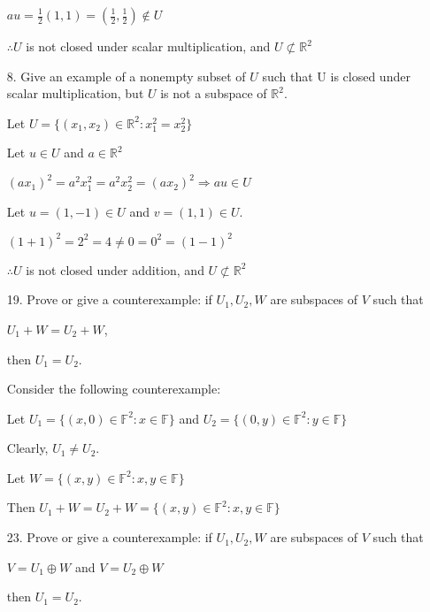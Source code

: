 \documentclass{article}
\begin{document}
\begin{enumerate}[nolistsep]
		$au = \frac{1}{2}(1, 1) = (\frac{1}{2}, \frac{1}{2}) \not\in U$
		
		$\therefore U$ is not closed under scalar multiplication, and $U \not\subset \mathbb{R}^2$
		
		\item[8.] Give an example of a nonempty subset of $U$ such that U is closed under scalar multiplication, but $U$ is not a subspace of $\mathbb{R}^2$.
		
		Let $U = \{(x_1, x_2) \in \mathbb{R}^2 : x_1^2 = x_2^2\}$
		
		Let $u \in U$ and $a \in \mathbb{R}^2$
		
		$(ax_1)^2 = a^2x_1^2 = a^2x_2^2 = (ax_2)^2 \Rightarrow au \in U$
		
		Let $u = (1, -1) \in U$ and $v = (1, 1) \in U$.
		
		$(1 + 1)^2 = 2^2 = 4 \neq 0 = 0^2 = (1 - 1)^2$
		
		$\therefore U$ is not closed under addition, and $U \not\subset \mathbb{R}^2$
		
		\item[19.] Prove or give a counterexample: if $U_1, U_2, W$ are subspaces of $V$ such that
		
\centerline{$U_1 + W = U_2 + W$,}

then $U_1 = U_2$. 
		
		Consider the following counterexample:

		Let $U_1 = \{(x, 0) \in \mathbb{F}^2 : x \in \mathbb{F}\}$ and $U_2 = \{(0, y) \in \mathbb{F}^2 : y \in \mathbb{F}\}$
		
		Clearly, $U_1 \neq U_2$.
		
		Let $W = \{(x, y) \in \mathbb{F}^2 : x, y \in \mathbb{F}\}$
		
		Then $U_1 + W = U_2 + W = \{(x, y) \in \mathbb{F}^2 : x, y \in \mathbb{F}\}$
		
		\item[23.] Prove or give a counterexample: if $U_1, U_2, W$ are subspaces of $V$ such that
		
		\centerline{$V = U_1 \oplus W$ and $V = U_2 \oplus W$}
		
		then $U_1 = U_2$.
		
	\end{enumerate}
\end{document}
